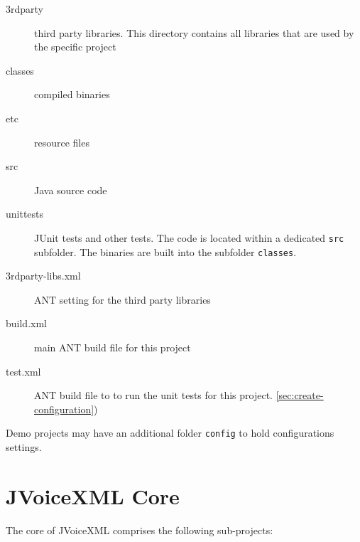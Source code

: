 \documentclass[11pt,a4paper]{article}
\begin{document}
\begin{description}
\item[3rdparty] third party libraries. This directory contains all libraries
that are used by the specific project 
\item[classes] compiled binaries
\item[etc] resource files
\item[src] Java source code
\item[unittests] JUnit tests and other tests. The code is located within a
dedicated \texttt{src} subfolder. The binaries are built into the subfolder
\texttt{classes}.
\item[3rdparty-libs.xml] ANT setting for the third party libraries
\item[build.xml] main ANT build file for this project
\item[test.xml] ANT build file to to run the unit tests for this project.
\ref{sec:create-configuration})
\end{description}

Demo projects may have an additional folder \texttt{config} to hold
configurations settings. 

\section{JVoiceXML Core}
\label{sec:jvoicexml-core}

The core of JVoiceXML comprises the following sub-projects:
\end{document}
